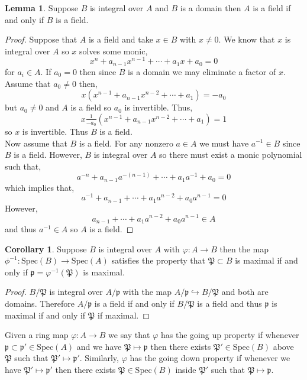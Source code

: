 \documentclass[12pt]{article}
\newcommand{\spec}[1]{\mathrm{Spec}\left( #1 \right)}
\newcommand{\p}{\mathfrak{p}}
\theoremstyle{remark}
\theoremstyle{definition}
\newtheorem{lemma}[theorem]{Lemma}
\newtheorem{corollary}[theorem]{Corollary}
\newenvironment{definition}[1][Definition:]{\begin{trivlist}
\item[\hskip \labelsep {\bfseries #1}]}{\end{trivlist}}
\begin{document}
\begin{lemma}
Suppose $B$ is integral over $A$ and $B$ is a domain then $A$ is a field if and only if $B$ is a field.
\end{lemma}

\begin{proof}
Suppose that $A$ is a field and take $x \in B$ with $x \neq 0$. We know that $x$ is integral over $A$ so $x$ solves some monic,
\[ x^n + a_{n-1} x^{n-1} + \cdots + a_1 x + a_0 = 0 \]
for $a_i \in A$. If $a_0 = 0$ then since $B$ is a domain we may eliminate a factor of $x$. Assume that $a_0 \neq 0$ then,
\[ x (x^{n-1} + a_{n-1} x^{n-2} + \cdots + a_1) = - a_0 \]
but $a_0 \neq 0$ and $A$ is a field so $a_0$ is invertible. Thus,
\[ x \tfrac{1}{-a_0} (x^{n-1} + a_{n-1} x^{n-2} + \cdots + a_1) = 1 \]
so $x$ is invertible. Thus $B$ is a field. 
\bigskip\\
Now assume that $B$ is a field. For any nonzero $a \in A$ we must have $a^{-1} \in B$ since $B$ is a field. However, $B$ is integral over $A$ so there must exist a monic polynomial such that,
\[ a^{-n} + a_{n-1} a^{-(n-1)} + \cdots + a_1 a^{-1} + a_0 = 0 \]
which implies that,
\[ a^{-1} + a_{n-1} + \cdots + a_1 a^{n-2} + a_0 a^{n-1} = 0 \]
However,
\[ a_{n-1} + \cdots + a_1 a^{n-2} + a_0 a^{n-1} \in A \]
and thus $a^{-1} \in A$ so $A$ is a field. 
\end{proof}

\begin{corollary}
Suppose $B$ is integral over $A$ with $\varphi : A \to B$ then the map $\phi^{-1} : \spec{B} \to \spec{A}$ satisfies the property that $\mathfrak{P} \subset B$ is maximal if and only if $\p = \varphi^{-1}(\mathfrak{P})$ is maximal. 
\end{corollary}

\begin{proof}
$B / \mathfrak{P}$ is integral over $A / \p$ with the map $A / \p \hookrightarrow B / \mathfrak{P}$ and both are domains. Therefore $A / \p$ is a field if and only if $B / \mathfrak{P}$ is a field and thus $\p$ is maximal if and only if $\mathfrak{P}$ if maximal. 
\end{proof}

\begin{definition}
Given a ring map $\varphi : A \to B$ we say that $\varphi$ has the going up property if whenever $\p \subset \p' \in \spec{A}$ and we have $\mathfrak{P} \mapsto \p$ then there exists $\mathfrak{P}' \in \spec{B}$ above $\mathfrak{P}$ such that $\mathfrak{P}' \mapsto \p'$. Similarly, $\varphi$ has the going down property if whenever we have $\mathfrak{P}' \mapsto \p'$ then there exists $\mathfrak{P} \in \spec{B}$ inside $\mathfrak{P}'$ such that $\mathfrak{P} \mapsto \p$. 
\end{definition}
\end{document}

